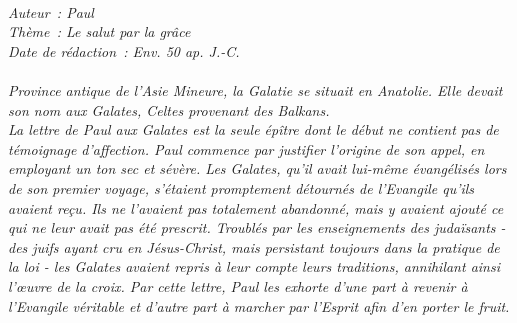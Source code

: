 \BFont
\noindent\hrulefill
{\footnotesize
\textit{
\bigskip
{\centering{}
\\Auteur~: Paul
\\Thème~: Le salut par la grâce
\\Date de rédaction~: Env. 50 ap. J.-C.\\}
}
\textit{
\\Province antique de l'Asie Mineure, la Galatie se situait en Anatolie. Elle devait son nom aux Galates, Celtes provenant des Balkans.
\\La lettre de Paul aux Galates est la seule épître dont le début ne contient pas de témoignage d'affection. Paul commence par justifier l'origine de son appel, en employant un ton sec et sévère. Les Galates, qu'il avait lui-même évangélisés lors de son premier voyage, s'étaient promptement détournés de l'Evangile qu'ils avaient reçu. Ils ne l'avaient pas totalement abandonné, mais y avaient ajouté ce qui ne leur avait pas été prescrit. Troublés par les enseignements des judaïsants - des juifs ayant cru en Jésus-Christ, mais persistant toujours dans la pratique de la loi - les Galates avaient repris à leur compte leurs traditions, annihilant ainsi l'œuvre de la croix. Par cette lettre, Paul les exhorte d'une part à revenir à l'Evangile véritable et d'autre part à marcher par l'Esprit afin d'en porter le fruit.\bigskip
}
}
\par\nobreak\noindent\hrulefill
